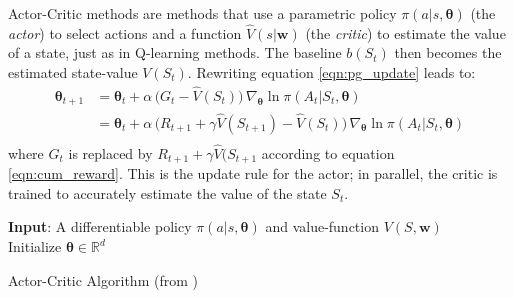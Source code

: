 Actor-Critic methods \cite{konda2000actor} are methods that use a parametric policy $\pi(a|s, \bm{\theta})$ (the \emph{actor}) to select actions and a function $\hat V(s|\bm{w})$ (the \emph{critic}) to estimate the value of a state, just as in Q-learning methods. The baseline $b(S_t)$ then becomes the estimated state-value $V(S_t)$. Rewriting equation \ref{eqn:pg_update} leads to:
\begin{equation}
    \label{eqn:actor_critic}
    \begin{split}
    \bm{\theta}_{t+1} &= \bm{\theta}_{t} + \alpha \,\big ( G_t - \hat V(S_t) \big) \,                                       \nabla_{\bm{\theta}} \ln \pi(A_t|S_t,\bm{\theta}) \\
                     &= \bm{\theta}_{t} + \alpha \,\big ( R_{t+1}+\gamma \hat V(S_{t+1}) - \hat V(S_t) \big) \,                                       \nabla_{\bm{\theta}} \ln \pi(A_t|S_t,\bm{\theta}) \\
    \end{split}
\end{equation}
where $G_t$ is replaced by $R_{t+1}+\gamma \hat V(S_{t+1}$ according to equation \ref{eqn:cum_reward}. This is the update rule for the actor; in parallel, the critic is trained to accurately estimate the value of the state $S_t$.\\
\begin{algorithm}[H]
\SetAlgoLined
\textbf{Input}: A differentiable policy $\pi(a|s, \bm{\theta})$ and value-function $V(S, \bm{w})$\\
Initialize $\bm{\theta} \in \mathbb{R}^d$\\
 \caption{Actor-Critic Algorithm (from \cite{sutton2018reinforcement})}
 \label{algo:actor_critic}
\end{algorithm}
